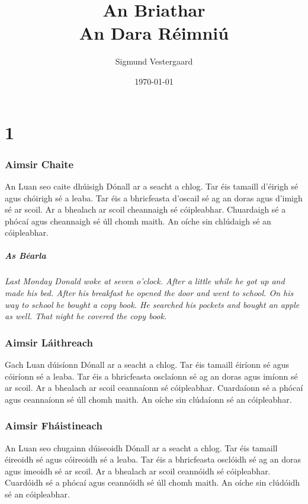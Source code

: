 \documentclass[article,a4paper,oneside,12pt]{memoir}
\title{\textbf{An Briathar} \\ \large An Dara R\'{e}imniú}
\author{Sigmund Vestergaard}
\date{\today}
\begin{document}
\maketitle

\chapter*{1}

\subsection*{Aimsir Chaite}
An Luan seo caite dhúisigh Dónall ar a seacht a chlog. Tar \'{e}is tamaill d'\'{e}irigh s\'{e} agus chóirigh s\'{e} a leaba. Tar \'{e}is a bhricfeasta d'oscail s\'{e} ag an doras agus d'imigh s\'{e} ar scoil. Ar a bhealach ar scoil cheannaigh s\'{e} cóipleabhar. Chuardaigh s\'{e} a phócaí agus cheannaigh s\'{e} úll chomh maith. An oíche sin chlúdaigh s\'{e} an cóipleabhar.
\paragraph{As B\'{e}arla}\emph{Last Monday Donald woke at seven o'clock. After a little while he got up and made his bed. After his breakfast he opened the door and went to school. On his way to school he bought a copy book. He searched his pockets and bought an apple as well. That night he covered the copy book.}

\subsection*{Aimsir Láithreach}
Gach Luan dúisíonn Dónall ar a seacht a chlog. Tar \'{e}is tamaill \'{e}iríonn s\'{e} agus cóiríonn s\'{e} a leaba. Tar \'{e}is a bhricfeasta osclaíonn s\'{e} ag an doras agus imíonn s\'{e} ar scoil. Ar a bhealach ar scoil ceannaíonn s\'{e} cóipleabhar. Cuardaíonn s\'{e} a phócaí agus ceannaíonn s\'{e} úll chomh maith. An oíche sin clúdaíonn s\'{e} an cóipleabhar.

\subsection*{Aimsir Fháistineach}
An Luan seo chugainn dúiseoidh Dónall ar a seacht a chlog. Tar \'{e}is tamaill
\'{e}ireoidh s\'{e} agus cóireoidh s\'{e} a leaba. Tar \'{e}is a bhricfeasta
osclóidh s\'{e} ag an doras agus imeoidh s\'{e} ar scoil. Ar a bhealach ar
scoil ceannóidh s\'{e} cóipleabhar. Cuardóidh s\'{e} a phócaí agus ceannóidh
s\'{e} úll chomh maith. An oíche sin clúdóidh s\'{e} an cóipleabhar.
\end{document}
